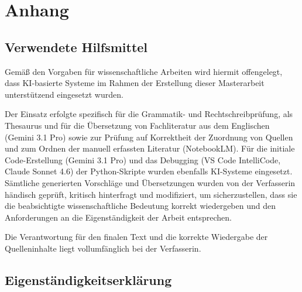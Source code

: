 \part*{Anhang}




%



\chapter{Verwendete Hilfsmittel}

Gemäß den Vorgaben für wissenschaftliche Arbeiten wird hiermit offengelegt, dass KI-basierte Systeme im Rahmen der Erstellung dieser Masterarbeit unterstützend eingesetzt wurden. 

Der Einsatz erfolgte spezifisch für die Grammatik- und Rechtschreibprüfung, als Thesaurus und für die Übersetzung von Fachliteratur aus dem Englischen (Gemini 3.1 Pro) sowie zur Prüfung auf Korrektheit der Zuordnung von Quellen und zum Ordnen der manuell erfassten Literatur (NotebookLM). Für die initiale Code-Erstellung (Gemini 3.1 Pro) und das Debugging (VS Code IntelliCode, Claude Sonnet 4.6) der Python-Skripte wurden ebenfalls KI-Systeme eingesetzt.  Sämtliche generierten Vorschläge und Übersetzungen wurden von der Verfasserin händisch geprüft, kritisch hinterfragt und modifiziert, um sicherzustellen, dass sie die beabsichtigte wissenschaftliche Bedeutung korrekt wiedergeben und den Anforderungen an die Eigenständigkeit der Arbeit entsprechen.

Die Verantwortung für den finalen Text und die korrekte Wiedergabe der Quelleninhalte liegt vollumfänglich bei der Verfasserin.

 


\cleardoublepage

\chapter{Eigenständigkeitserklärung}

